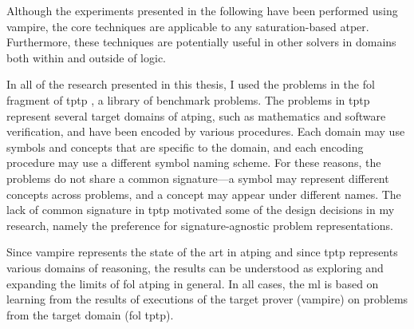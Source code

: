 Although the experiments presented in the following have been performed using \gls{vampire},
the core techniques are applicable to any \gls{saturation}-based \gls{atper}.
Furthermore, these techniques are potentially useful in other solvers in domains both within and outside of logic.

In all of the research presented in this thesis, I used the problems in the \gls{fol} fragment of \gls{tptp} \cite{Sutcliffe2017}, a library of benchmark problems.
The problems in \gls{tptp} represent several target domains of \gls{atping},
such as mathematics and software verification, and have been encoded by various procedures.
Each domain may use symbols and concepts that are specific to the domain,
and each encoding procedure may use a different symbol naming scheme.
For these reasons, the problems do not share a common \gls{signature}---a symbol may represent different concepts across problems, and a concept may appear under different names.
The lack of common signature in \gls{tptp} motivated some of the design decisions in my research, namely the preference for signature-agnostic problem representations.

Since \gls{vampire} represents the state of the art in \gls{atping} \cite{doi:10.1177/30504554241305110,DBLP:journals/aicom/SutcliffeD23}
and since \gls{tptp} represents various domains of reasoning,
the results can be understood as exploring and expanding the limits of \gls{fol} \gls{atping} in general.
In all cases, the \gls{ml} is based on learning from the results of executions of the target prover (\gls{vampire}) on problems from the target domain (\gls{fol} \gls{tptp}).


